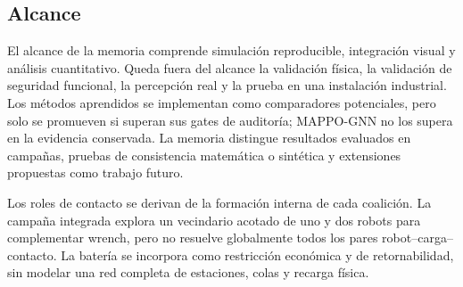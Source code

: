 \subsection{Alcance}

El alcance de la memoria comprende simulación reproducible, integración visual y análisis cuantitativo. Queda fuera del alcance la validación física, la validación de seguridad funcional, la percepción real y la prueba en una instalación industrial. Los métodos aprendidos se implementan como comparadores potenciales, pero solo se promueven si superan sus gates de auditoría; MAPPO-GNN no los supera en la evidencia conservada. La memoria distingue resultados evaluados en campañas, pruebas de consistencia matemática o sintética y extensiones propuestas como trabajo futuro.

Los roles de contacto se derivan de la formación interna de cada coalición. La campaña integrada explora un vecindario acotado de uno y dos robots para complementar wrench, pero no resuelve globalmente todos los pares robot--carga--contacto. La batería se incorpora como restricción económica y de retornabilidad, sin modelar una red completa de estaciones, colas y recarga física.
